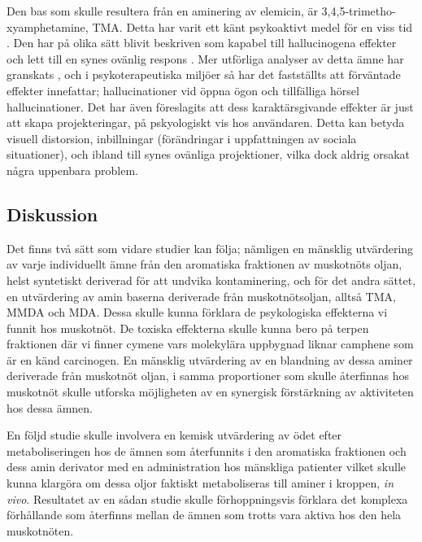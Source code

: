 \documentclass{theme/franska}
\begin{document}
{	Den bas som skulle resultera från en aminering av elemicin, är
	3,4,5-trimetho-xyamphetamine, TMA. Detta har varit ett känt psykoaktivt medel för en viss tid \cite{peretz1955new}.
	Den har på olika sätt blivit beskriven som kapabel till hallucinogena effekter
	och lett till en synes ovänlig respons \cite{shulgin1995pihkal}.
	Mer utförliga analyser av detta ämne har granskats \cite{shulgin1995pihkal}, och i psykoterapeutiska miljöer så har det fastställts att förväntade effekter innefattar; hallucinationer vid öppna ögon och tillfälliga hörsel hallucinationer.
	Det har även föreslagits att dess karaktärsgivande effekter är just att skapa projekteringar, på pskyologiskt vis hos användaren.
	Detta kan betyda visuell distorsion, inbillningar (förändringar i uppfattningen av sociala situationer), och ibland till synes ovänliga projektioner, vilka dock aldrig orsakat några uppenbara problem.

	\subsection{Diskussion}

Det finns två sätt som vidare studier kan följa; nämligen en mänsklig utvärdering
av varje individuellt ämne från den aromatiska fraktionen av muskotnöts oljan,
helst syntetiskt deriverad för att undvika kontaminering, och för det andra sättet,
en utvärdering av amin baserna deriverade från muskotnötsoljan, alltså
TMA, MMDA och MDA. Dessa skulle kunna förklara de psykologiska effekterna
vi funnit hos muskotnöt. De toxiska effekterna skulle kunna bero på terpen fraktionen
där vi finner cymene vars molekylära uppbygnad liknar camphene som är en känd
carcinogen. En mänsklig utvärdering av en blandning av dessa aminer deriverade från
muskotnöt oljan, i samma proportioner som skulle återfinnas hos muskotnöt skulle
utforska möjligheten av en synergisk förstärkning av aktiviteten hos dessa ämnen.

En följd studie skulle involvera en kemisk utvärdering av ödet efter metaboliseringen
hos de ämnen som återfunnits i den aromatiska fraktionen och dess amin derivator
med en administration hos mänskliga patienter vilket skulle kunna klargöra om dessa
oljor faktiskt metaboliseras till aminer i kroppen, \textit{in vivo}.
Resultatet av en sådan studie skulle förhoppningsvis förklara det
komplexa förhållande som återfinns mellan de ämnen som trotts vara aktiva
hos den hela muskotnöten.




}
\end{document}
